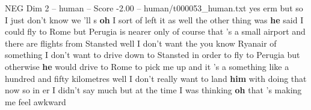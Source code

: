 \begin{textsample}{NEG Dim 2 – human – Score -2.00 – human/t000053\_human.txt}  \label{ex:f2_neg_019}
yes erm but so I just don't know we 'll s \textbf{oh} I sort of left it as well the other thing was \textbf{he} said I could fly to Rome but Perugia is nearer only of course that 's a small airport and there are flights from Stansted well I don't want the you know Ryanair of something I don't want to drive down to Stansted in order to fly to Perugia but otherwise \textbf{he} would drive to Rome to pick me up and it 's a something like a hundred and fifty kilometres well I don't really want to land \textbf{him} with doing that now so in er I didn't say much but at the time I was thinking \textbf{oh} that 's making me feel awkward

\end{textsample}
